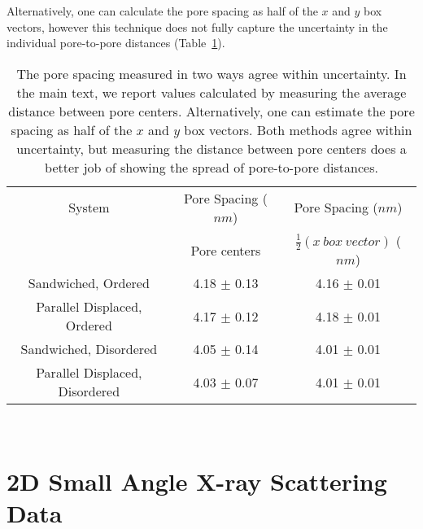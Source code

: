   Alternatively, one can calculate the pore spacing as half of the $x$ and $y$
  box vectors, however this technique does not fully capture the uncertainty
  in the individual pore-to-pore distances (Table~\ref{S-table:p2p}). 
  
  \begin{table}[h]
  \centering
  \begin{tabular}{ccc}
  \hline
  System                         & Pore Spacing ($nm$) & Pore Spacing ($nm$)              \\
                                 & Pore centers        & $\frac{1}{2}(x\ box\ vector)$ ($nm$) \\ 
  \hline
  Sandwiched, Ordered            & 4.18 $\pm$ 0.13     & 4.16 $\pm$ 0.01                  \\
  Parallel Displaced, Ordered    & 4.17 $\pm$ 0.12     & 4.18 $\pm$ 0.01                  \\
  Sandwiched, Disordered         & 4.05 $\pm$ 0.14     & 4.01 $\pm$ 0.01                  \\
  Parallel Displaced, Disordered & 4.03 $\pm$ 0.07     & 4.01 $\pm$ 0.01                  \\
  \hline
  \end{tabular}
  \caption{The pore spacing measured in two ways agree within uncertainty. In the main
  text, we report values calculated by measuring the average distance between pore centers. 
  Alternatively, one can estimate the pore spacing as half of the $x$ and $y$ box vectors.
  Both methods agree within uncertainty, but measuring the distance between pore centers
  does a better job of showing the spread of pore-to-pore distances.}~\label{S-table:p2p}
  \end{table}

  \clearpage

  \section{2D Small Angle X-ray Scattering Data}  
 
